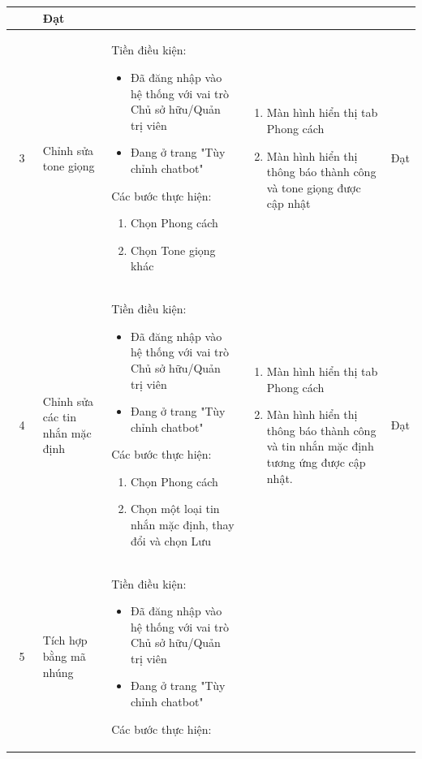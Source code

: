 \begin{longtable}{|c|m{2.5cm}|m{5.5cm}|m{4.5cm}|c|}
\begin{enumerate}[label=\arabic*.]
\end{enumerate}  & Đạt \\
\hline
3 & 
Chỉnh sửa tone giọng & 
Tiền điều kiện:
\begin{itemize}
    \item Đã đăng nhập vào hệ thống với vai trò Chủ sở hữu/Quản trị viên
    \item Đang ở trang "Tùy chỉnh chatbot"
\end{itemize}
Các bước thực hiện: 
\begin{enumerate}[label=\arabic*.]
    \item Chọn Phong cách
    \item Chọn Tone giọng khác
\end{enumerate}
& 
\begin{enumerate}[label=\arabic*.]
    \item Màn hình hiển thị tab Phong cách
    \item Màn hình hiển thị thông báo thành công và tone giọng được cập nhật
\end{enumerate}  & Đạt \\
\hline
4 & 
Chỉnh sửa các tin nhắn mặc định & 
Tiền điều kiện:
\begin{itemize}
    \item Đã đăng nhập vào hệ thống với vai trò Chủ sở hữu/Quản trị viên
    \item Đang ở trang "Tùy chỉnh chatbot"
\end{itemize}
Các bước thực hiện: 
\begin{enumerate}[label=\arabic*.]
    \item Chọn Phong cách
    \item Chọn một loại tin nhắn mặc định, thay đổi và chọn Lưu
\end{enumerate}
& 
\begin{enumerate}[label=\arabic*.]
    \item Màn hình hiển thị tab Phong cách
    \item Màn hình hiển thị thông báo thành công và tin nhắn mặc định tương ứng được cập nhật.
\end{enumerate}  & Đạt \\
\hline
5 & 
Tích hợp bằng mã nhúng & 
Tiền điều kiện:
\begin{itemize}
    \item Đã đăng nhập vào hệ thống với vai trò Chủ sở hữu/Quản trị viên
    \item Đang ở trang "Tùy chỉnh chatbot"
\end{itemize}
Các bước thực hiện: 

\end{longtable}
